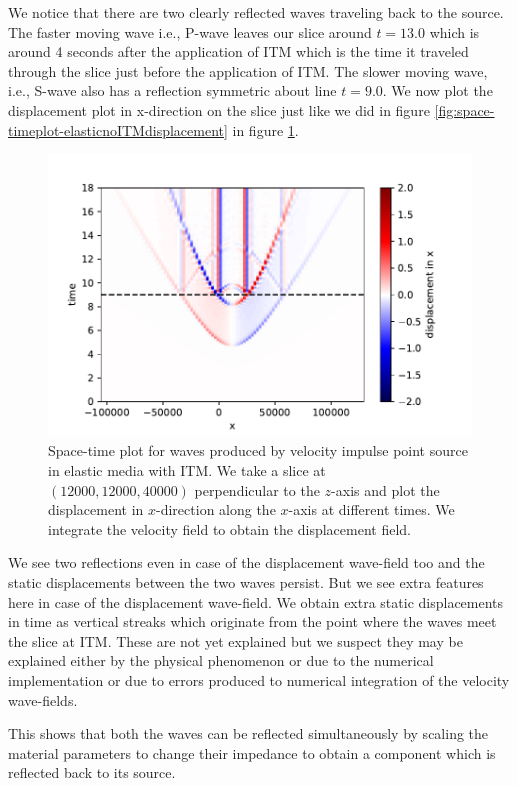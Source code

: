 We notice that there are two clearly reflected waves traveling back to the source. The faster moving wave i.e., P-wave leaves our slice around 
$t=13.0$ which is around 4 seconds after the application of \ac{ITM} which is the time it traveled through the slice just before the application of \ac{ITM}. 
The slower moving wave, i.e., S-wave also has a reflection symmetric about line $t=9.0$. We now plot the displacement plot in x-direction on the 
slice just like we did in figure \ref{fig:space-timeplot-elasticnoITMdisplacement} in figure \ref{fig:space-timeplot-elasticITMdisplacement}.

\begin{figure}[htpb]
    \centering
    \includegraphics[width=0.75\linewidth]{figures/Elastic-tworeflections-displacement.pdf}
    \caption{Space-time plot for waves produced by velocity impulse point source in elastic media with \ac{ITM}. We take a slice at $\left(12000,12000,40000\right)$ perpendicular to the $z$-axis
    and plot the displacement in $x$-direction along the $x$-axis at different times. We integrate the velocity field to obtain the displacement field.}
    \label{fig:space-timeplot-elasticITMdisplacement}
\end{figure}

We see two reflections even in case of the displacement wave-field too and the static displacements between the two waves persist. But we see extra features here in case of the displacement wave-field. We obtain extra static displacements in time as vertical streaks which originate from the point where the waves meet the slice at \ac{ITM}. These are not yet explained but we suspect they may be explained either by the physical phenomenon or due to the numerical implementation or due to errors produced to numerical integration of the velocity wave-fields.
\par This shows that both the waves can be reflected simultaneously by scaling the material parameters to change their impedance to obtain a component which 
is reflected back to its source.

